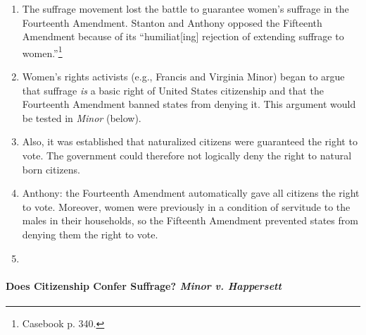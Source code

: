 \begin{enumerate}
    \item The suffrage movement lost the battle to guarantee women's suffrage 
    in the Fourteenth Amendment. Stanton and Anthony opposed the Fifteenth 
    Amendment because of its ``humiliat[ing] rejection of extending suffrage 
    to women.''\footnote{Casebook p. 340.}
    \item Women's rights activists (e.g., Francis and Virginia Minor) began to 
    argue that suffrage \emph{is} a basic right of United States citizenship 
    and that the Fourteenth Amendment banned states from denying it. This 
    argument would be tested in \emph{Minor} (below).
    \item Also, it was established that naturalized citizens were guaranteed 
    the right to vote. The government could therefore not logically deny the 
    right to natural born citizens.
    \item Anthony: the Fourteenth Amendment automatically gave all citizens 
    the right to vote. Moreover, women were previously in a condition of 
    servitude to the males in their households, so the Fifteenth Amendment 
    prevented states from denying them the right to vote.
    \item 
\end{enumerate}

\paragraph{Does Citizenship Confer Suffrage? \emph{Minor v. Happersett}}

